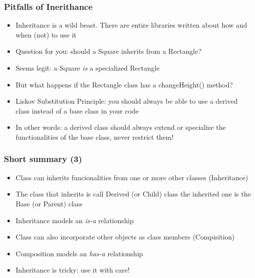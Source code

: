 \documentclass[9pt]{beamer}
\begin{document}
\begin{frame}
  \frametitle{Pitfalls of Inerithance}
    
  \begin{itemize}
    \item Inheritance is a wild beast. There are entire libraries written about how and when (not) to use it
    
    \bigskip
    
    \item Question for you: should a Square inherits from a Rectangle?
    \item Seems legit: a Square \emph{is} a specialized Rectangle
    \item But what happens if the Rectangle class has a changeHeight() method?
    \bigskip
    
    \bigskip
    
    \item \alert{Liskov Substitution Principle}: you should always be able to use
          a derived class instead of a base class in your code
    \item In other words: a derived class should always extend or specialize
          the functionalities of the base class, never restrict them!
   \end{itemize}
  
\end{frame}



\begin{frame}
  \frametitle{Short summary (3)}
    
  \begin{itemize}
    \item Class can inherits funcionalities from one or more other classes (Inheritance)
    \smallskip
    \item The class that inherits is call Derived (or Child) class the inherited one is the Base (or Parent) class
    \smallskip
    \item Inheritance models an \emph{is-a} relationship
    \smallskip
    \item Class can also incorporate other objects as class members (Compisition)
    \smallskip
    \item Composition models an \emph{has-a} relationship
    \smallskip
    \item Inheritance is tricky: use it with care!
   \end{itemize}
  
\end{frame}
\end{document}

